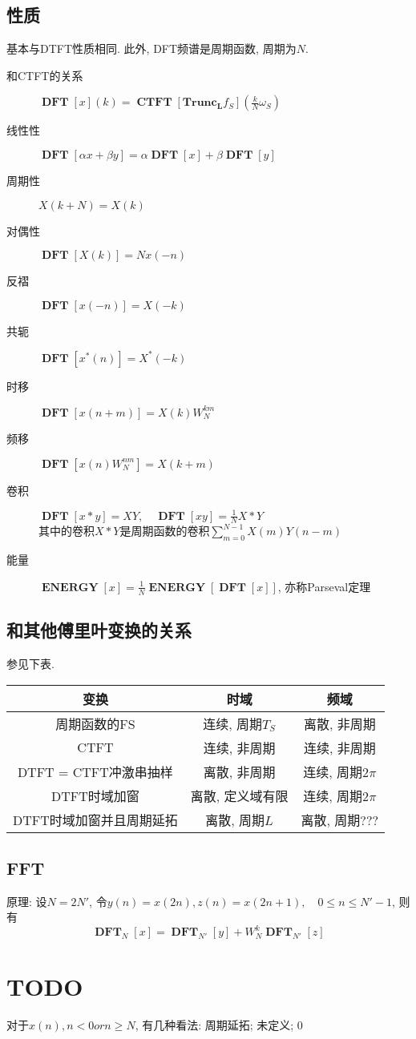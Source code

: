 \documentclass{ctexart}
\DeclareMathOperator{\CTFT}{\mathbf{CTFT}}
\DeclareMathOperator{\DFT}{\mathbf{DFT}}
\DeclareMathOperator{\ENERGY}{\mathbf{ENERGY}}
\begin{document}
\subsection{性质}
    基本与DTFT性质相同. 此外, DFT频谱是周期函数, 周期为$N$.
    \begin{description}
        \item[和CTFT的关系] $\DFT[x](k) = \CTFT[\mathbf{Trunc_L} f_{S}](\frac{k}{N} \omega_S)$
        \item[线性性] $\displaystyle \DFT[\alpha x + \beta y] = \alpha \DFT[x] + \beta \DFT[y]$
        \item[周期性] $\displaystyle X(k + N) = X(k)$
        \item[对偶性] $\displaystyle \DFT[X(k)] = N x(-n)$
        \item[反褶] $\displaystyle \DFT[x(-n)] = X(-k)$
        \item[共轭] $\displaystyle \DFT[x^*(n)] = X^*(-k)$
        \item[时移] $\displaystyle \DFT[x(n + m)] = X(k) W_N^{km}$
        \item[频移] $\displaystyle \DFT[x(n) W_N^{nm}] = X(k + m)$
        \item[卷积] $\displaystyle \DFT[x * y] = X Y,\quad \DFT[x y] = \frac{1}{N} X * Y$\\
            其中的卷积$X * Y$是周期函数的卷积$\sum_{m = 0}^{N-1} X(m) Y(n-m)$
        \item[能量] $\displaystyle \ENERGY[x] = \frac{1}{N} \ENERGY[\DFT[x]]$, 亦称Parseval定理
    \end{description}

\subsection{和其他傅里叶变换的关系} 参见下表.
    \begin{table}[ht!]
        \centering
        \begin{tabular}{|c|c|c|}
            \hline
            变换 & 时域 & 频域\\ \hline
            周期函数的FS & 连续, 周期$T_S$ & 离散, 非周期 \\ \hline
            CTFT & 连续, 非周期 & 连续, 非周期\\ \hline
            DTFT = CTFT冲激串抽样 & 离散, 非周期 & 连续, 周期$2\pi$\\\hline
            DTFT时域加窗 & 离散, 定义域有限 & 连续, 周期$2\pi$\\\hline
            DTFT时域加窗并且周期延拓 & 离散, 周期$L$ & 离散, 周期$???$ \\ \hline
        \end{tabular}
    \end{table}

\subsection{FFT}
    原理: 设$N = 2N'$, 令$y(n) = x(2n), z(n) = x(2n+1),\quad 0 \le n \le N' - 1$, 则有\[
        \DFT_{N} [x] = \DFT_{N'} [y] + W_N^k \DFT_{N'} [z] \]

\section{TODO}
    对于$x(n), n < 0 or n \ge N$, 有几种看法:
        周期延拓; 未定义; 0
\end{document}
